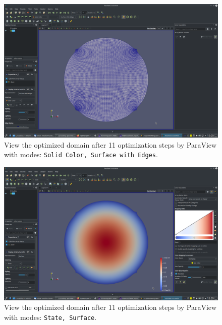 \documentclass[onsided]{book}
\numberwithin{equation}{section}
\begin{document}
\begin{enumerate}
\begin{enumerate}
        \begin{figure}[H]
            \centering
            \includegraphics[height=0.44\textheight]{L2-tracking_optimized_domain_after_11_steps_Solid_Color_Surface_with_Edges}
            \caption{View the optimized domain after 11 optimization steps by ParaView with modes: \texttt{Solid Color, Surface with Edges}.}
        \end{figure}
    
        \begin{figure}[H]
            \centering
            \includegraphics[height=0.44\textheight]{L2-tracking_optimized_domain_after_11_steps_State_Surface}
            \caption{View the optimized domain after 11 optimization steps by ParaView with modes: \texttt{State, Surface}.}
        \end{figure}
        

\end{enumerate}
\end{enumerate}
\end{document}
